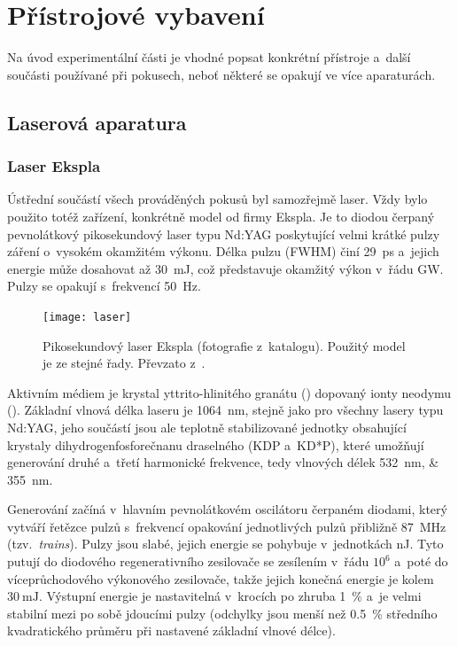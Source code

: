 \chapter{Přístrojové vybavení}
\label{sec:instruments}
Na úvod experimentální části je vhodné popsat konkrétní přístroje
a~další součásti používané při pokusech,
neboť některé se opakují ve více aparaturách.

\section{Laserová aparatura}
\label{sec:instruments-laser}

\subsection{Laser Ekspla }
\label{sec:instruments-laser-source}
Ústřední součástí všech prováděných pokusů byl samozřejmě laser.
Vždy bylo použito totéž zařízení, konkrétně model 
od firmy Ekspla.
Je to diodou čerpaný pevnolátkový pikosekundový laser typu Nd:YAG
poskytující velmi krátké pulzy záření o~vysokém okamžitém výkonu.
Délka pulzu (FWHM) činí \SI{29}{\pico\second}
a~jejich energie může dosahovat až \SI{30}{\milli\joule},
což představuje okamžitý výkon v~řádu \si{\giga\watt}.
Pulzy se opakují s~frekvencí \SI{50}{\hertz}.

\begin{figure}[htp]
	\centering
	\texttt{[image: laser]}
	\caption{Pikosekundový laser Ekspla (fotografie z~katalogu).
		Použitý model je ze stejné řady.
		Převzato z~\cite{ekspla-datasheet}.}
	\label{fig:instruments-laser}
\end{figure}

Aktivním médiem je krystal yttrito-hlinitého granátu ()
dopovaný ionty neodymu ().\autocite{wiki-ndyag}
Základní vlnová délka laseru je \SI{1064}{\nano\metre},
stejně jako pro všechny lasery typu Nd:YAG,
jeho součástí jsou ale teplotně stabilizované jednotky obsahující
krystaly di\-hydro\-gen\-fosfo\-rečnanu draselného (KDP a~KD*P),
které umožňují generování druhé a~třetí harmonické frekvence,
tedy vlnových délek \SIlist{532; 355}{\nano\metre}.
\autocite{ekspla-datasheet}

Generování začíná v~hlavním pevnolátkovém oscilátoru čerpaném diodami,
který vytváří řetězce pulzů s~frekvencí opakování jednotlivých pulzů
přibližně \SI{87}{\mega\hertz} (tzv.~\emph{trains}).
Pulzy jsou slabé, jejich energie se pohybuje v~jednotkách \si{\nano\joule}.
Tyto putují do diodového regenerativního zesilovače se zesílením v~řádu $10^6$
a~poté do víceprůchodového výkonového zesilovače,
takže jejich konečná energie je kolem $\SI{30}{\milli\joule}$.
Výstupní energie je nastavitelná v~krocích po zhruba \SI{1}{\percent}
a~je velmi stabilní mezi po sobě jdoucími pulzy
(odchylky jsou menší než \SI{0.5}{\percent} středního kvadratického průměru
při nastavené základní vlnové délce).
\autocite{ekspla-datasheet}

